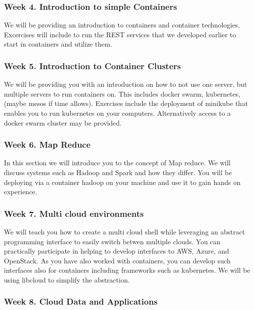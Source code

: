 \subsubsection{Week 4. Introduction to simple Containers}

We will be providing an introduction to containers and container
technologies. Excercises will include to run the REST services that we
developed earlier to start in containers and utilize them.

\subsubsection{Week 5. Introduction to Container Clusters}

We will be providing you with an introduction on how to not use one
server, but multiple servers to run containers on. This includes
docker swarm, kubernetes, (maybe mesos if time allows).
Exercises include the deployment of minikube that enables you to run
kubernetes on your computers. Alternatively access to a docker swarm
cluster may be provided.

\subsubsection{Week 6. Map Reduce}

In this section we will introduce you to the concept of Map reduce. We
will discuss systems such as Hadoop and Spark and how they differ. You
will be deploying via a container hadoop on your machine and use it to
gain hands on experience.

\subsubsection{Week 7. Multi cloud environments}

We will teach you how to create a multi cloud shell while leveraging
an abstract programming interface to easily switch betwen multiple
clouds. You can practically participate in helping to develop
interfaces to AWS, Azure, and OpenStack. As you have also worked with
containers, you can develop such interfaces also for containers
including frameworks such as kubernetes. We will be using libcloud to
simplify the abstraction.
	
\subsubsection{Week 8. Cloud Data and Applications}

